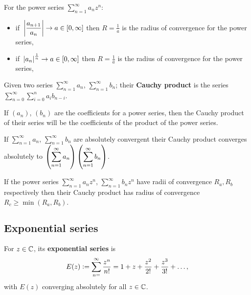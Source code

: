 \documentclass[../Year1.tex]{subfiles}
\begin{document}
\begin{theorem}
    For the power series $\displaystyle\sum_{n=1}^\infty a_nz^n$: \begin{itemize}
        \item if $\ \displaystyle\abs{\frac{a_{n+1}}{a_n}}\rightarrow a\in[0,\infty]$ then $\displaystyle R=\frac{1}{a}$ is the radius of convergence for the power series,
        \item if $\ \displaystyle\abs{a_n}^\frac{1}{n}\rightarrow a\in[0,\infty]$ then $\displaystyle R=\frac{1}{a}$ is the radius of convergence for the power series,
    \end{itemize}
\end{theorem}

\begin{definition}
    Given two series $\displaystyle\sum_{n=1}^\infty a_n$, $\displaystyle\sum_{n=1}^\infty b_n$; their \textbf{Cauchy product} is the series $\displaystyle\sum_{n=0}^\infty\sum_{i=0}^n a_ib_{n-i}$.
\end{definition}

\begin{remark}
     If $(a_n)$, $(b_n)$ are the coefficients for a power series, then the Cauchy product of their series will be the coefficients of the product of the power series.
\end{remark}

\begin{theorem}
    If $\displaystyle\sum_{n=1}^\infty a_n$, $\displaystyle\sum_{n=1}^\infty b_n$ are absolutely convergent their Cauchy product converges absolutely to $\displaystyle\br{\sum_{n=1}^\infty a_n}\br{\sum_{n=1}^\infty b_n}$.
\end{theorem}

\begin{theorem}
    If the power series $\displaystyle\sum_{n=1}^\infty a_nz^n$, $\displaystyle\sum_{n=1}^\infty b_nz^n$ have radii of convergence $R_a,R_b$ respectively then their Cauchy product has radius of convergence $R_c\geq\min(R_a,R_b)$.
\end{theorem}

\subsection{Exponential series}

\begin{definition}
    For $z\in\mathbb{C}$, its \textbf{exponential series} is \[
    E(z) := \sum_{n=}^\infty \frac{z^n}{n!} = 1 + z + \frac{z^2}{2!} + \frac{z^3}{3!} + \ldots
    \textcolor{black}{,}
    \] with $E(z)$ converging absolutely for all $z\in\mathbb{C}$.
\end{definition}
\end{document}
